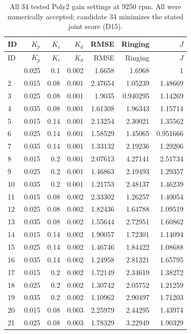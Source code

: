 {\small\setlength{\tabcolsep}{4pt}\begin{longtable}{@{}lrrrrrr@{}}
\caption{All 34 tested Poly2 gain settings at 9250 rpm. All were numerically accepted; candidate 34 minimizes the stated joint score (D15).}\label{tab:tune_all}\\\toprule ID & $K_p$ & $K_i$ & $K_d$ & RMSE & Ringing & $J$\\\midrule
\endfirsthead\toprule ID & $K_p$ & $K_i$ & $K_d$ & RMSE & Ringing & $J$\\\midrule
\endhead\bottomrule\endfoot
1 & 0.025 & 0.1 & 0.002 & 1.6658 & 1.6968 & 1\\
2 & 0.015 & 0.08 & 0.001 & 2.47654 & 1.05239 & 1.48669\\
3 & 0.025 & 0.08 & 0.001 & 1.9035 & 0.940295 & 1.14269\\
4 & 0.035 & 0.08 & 0.001 & 1.61308 & 1.96343 & 1.15714\\
5 & 0.015 & 0.14 & 0.001 & 2.13254 & 2.30021 & 1.35562\\
6 & 0.025 & 0.14 & 0.001 & 1.58529 & 1.45065 & 0.951666\\
7 & 0.035 & 0.14 & 0.001 & 1.33132 & 2.19236 & 1.29206\\
8 & 0.015 & 0.2 & 0.001 & 2.07613 & 4.27141 & 2.51734\\
9 & 0.025 & 0.2 & 0.001 & 1.46863 & 2.19493 & 1.29357\\
10 & 0.035 & 0.2 & 0.001 & 1.21753 & 2.48137 & 1.46239\\
11 & 0.015 & 0.08 & 0.002 & 2.33302 & 1.26257 & 1.40054\\
12 & 0.025 & 0.08 & 0.002 & 1.82436 & 1.64788 & 1.09519\\
13 & 0.035 & 0.08 & 0.002 & 1.55644 & 2.72951 & 1.60862\\
14 & 0.015 & 0.14 & 0.002 & 1.90057 & 1.72301 & 1.14094\\
15 & 0.025 & 0.14 & 0.002 & 1.46746 & 1.84422 & 1.08688\\
16 & 0.035 & 0.14 & 0.002 & 1.24958 & 2.81321 & 1.65795\\
17 & 0.015 & 0.2 & 0.002 & 1.72149 & 2.34619 & 1.38272\\
18 & 0.025 & 0.2 & 0.002 & 1.30742 & 2.05752 & 1.21259\\
19 & 0.035 & 0.2 & 0.002 & 1.10962 & 2.90497 & 1.71203\\
20 & 0.015 & 0.08 & 0.003 & 2.25979 & 2.44295 & 1.43974\\
21 & 0.025 & 0.08 & 0.003 & 1.78329 & 3.22949 & 1.90329\\

\end{longtable}}
